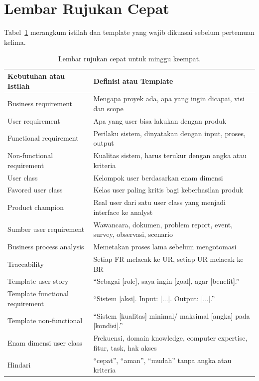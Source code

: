 \documentclass[11pt,a4paper]{article}
\begin{document}
\section{Lembar Rujukan Cepat}

Tabel~\ref{tab:cheat} merangkum istilah dan template yang wajib dikuasai sebelum pertemuan kelima.

\begin{table}[H]
	\centering
	\caption{Lembar rujukan cepat untuk minggu keempat.}
	\label{tab:cheat}
	\footnotesize
	\begin{tabularx}{\textwidth}{l X}
		\toprule
		Kebutuhan atau Istilah          & Definisi atau Template                                                  \\
		\midrule
		Business requirement            & Mengapa proyek ada, apa yang ingin dicapai, visi dan scope              \\
		User requirement                & Apa yang user bisa lakukan dengan produk                                \\
		Functional requirement          & Perilaku sistem, dinyatakan dengan input, proses, output                \\
		Non-functional requirement      & Kualitas sistem, harus terukur dengan angka atau kriteria               \\
		User class                      & Kelompok user berdasarkan enam dimensi                                  \\
		Favored user class              & Kelas user paling kritis bagi keberhasilan produk                       \\
		Product champion                & Real user dari satu user class yang menjadi interface ke analyst        \\
		Sumber user requirement         & Wawancara, dokumen, problem report, event, survey, observasi, scenario  \\
		Business process analysis       & Memetakan proses lama sebelum mengotomasi                               \\
		Traceability                    & Setiap FR melacak ke UR, setiap UR melacak ke BR                        \\
		Template user story             & ``Sebagai [role], saya ingin [goal], agar [benefit].''                  \\
		Template functional requirement & ``Sistem [aksi]. Input: [...]. Output: [...].''                         \\
		Template non-functional         & ``Sistem [kualitas] minimal/ maksimal [angka] pada [kondisi].''         \\
		Enam dimensi user class         & Frekuensi, domain knowledge, computer expertise, fitur, task, hak akses \\
		Hindari                         & ``cepat'', ``aman'', ``mudah'' tanpa angka atau kriteria                \\
		\bottomrule
	\end{tabularx}
\end{table}
\end{document}
